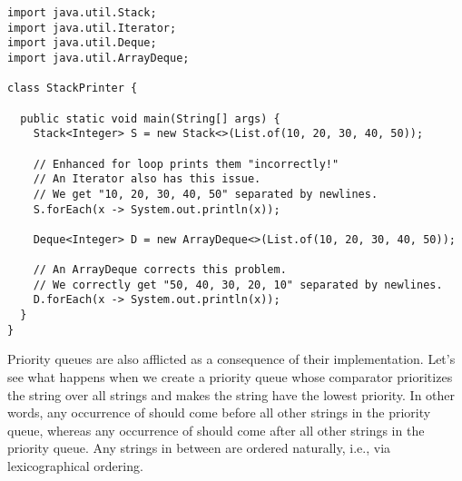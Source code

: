 \begin{lstlisting}[language=MyJava]
import java.util.Stack;
import java.util.Iterator;
import java.util.Deque;
import java.util.ArrayDeque;

class StackPrinter {

  public static void main(String[] args) {
    Stack<Integer> S = new Stack<>(List.of(10, 20, 30, 40, 50));

    // Enhanced for loop prints them "incorrectly!"
    // An Iterator also has this issue.
    // We get "10, 20, 30, 40, 50" separated by newlines.
    S.forEach(x -> System.out.println(x));

    Deque<Integer> D = new ArrayDeque<>(List.of(10, 20, 30, 40, 50));

    // An ArrayDeque corrects this problem.
    // We correctly get "50, 40, 30, 20, 10" separated by newlines.
    D.forEach(x -> System.out.println(x));
  }
}
\end{lstlisting}

Priority queues are also afflicted as a consequence of their implementation. 
Let's see what happens when we create a priority queue whose comparator prioritizes the string  over all strings and makes the string  have the lowest priority. 
In other words, any occurrence of  should come before all other strings in the priority queue, whereas any occurrence of  should come after all other strings in the priority queue. 
Any strings in between are ordered naturally, i.e., via lexicographical ordering.

